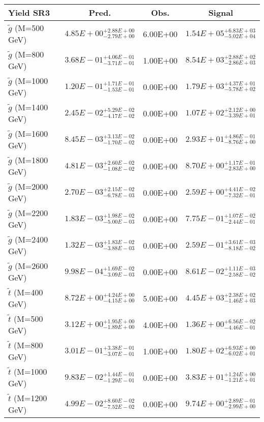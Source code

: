 \documentclass{article}
\begin{document}
 \begin{center}
 \begin{tabular}{ |l|c|c|c| } 
 \hline
 Yield SR3 & Pred. & Obs. & Signal \\
 \hline
 \hline
 $\tilde{g}$ (M=500 GeV) & $4.85E+00^{+2.88E+00}_{-2.79E+00}$ & 6.00E+00 & $1.54E+05^{+6.83E+03}_{-5.02E+04}$ \\
 \hline
 $\tilde{g}$ (M=800 GeV) & $3.68E-01^{+4.06E-01}_{-3.71E-01}$ & 1.00E+00 & $8.54E+03^{+2.88E+02}_{-2.86E+03}$ \\
 \hline
 $\tilde{g}$ (M=1000 GeV) & $1.20E-01^{+1.71E-01}_{-1.53E-01}$ & 0.00E+00 & $1.79E+03^{+4.37E+01}_{-5.78E+02}$ \\
 \hline
 $\tilde{g}$ (M=1400 GeV) & $2.45E-02^{+5.29E-02}_{-4.17E-02}$ & 0.00E+00 & $1.07E+02^{+2.12E+00}_{-3.39E+01}$ \\
 \hline
 $\tilde{g}$ (M=1600 GeV) & $8.45E-03^{+3.13E-02}_{-1.70E-02}$ & 0.00E+00 & $2.93E+01^{+4.86E-01}_{-8.76E+00}$ \\
 \hline
 $\tilde{g}$ (M=1800 GeV) & $4.81E-03^{+2.60E-02}_{-1.08E-02}$ & 0.00E+00 & $8.70E+00^{+1.17E-01}_{-2.83E+00}$ \\
 \hline
 $\tilde{g}$ (M=2000 GeV) & $2.70E-03^{+2.15E-02}_{-6.78E-03}$ & 0.00E+00 & $2.59E+00^{+4.41E-02}_{-7.32E-01}$ \\
 \hline
 $\tilde{g}$ (M=2200 GeV) & $1.83E-03^{+1.98E-02}_{-5.00E-03}$ & 0.00E+00 & $7.75E-01^{+1.07E-02}_{-2.44E-01}$ \\
 \hline
 $\tilde{g}$ (M=2400 GeV) & $1.32E-03^{+1.83E-02}_{-3.88E-03}$ & 0.00E+00 & $2.59E-01^{+3.61E-03}_{-8.18E-02}$ \\
 \hline
 $\tilde{g}$ (M=2600 GeV) & $9.98E-04^{+1.69E-02}_{-3.09E-03}$ & 0.00E+00 & $8.61E-02^{+1.11E-03}_{-2.58E-02}$ \\
 \hline
 $\tilde{t}$ (M=400 GeV) & $8.72E+00^{+4.24E+00}_{-4.15E+00}$ & 5.00E+00 & $4.45E+03^{+2.38E+02}_{-1.46E+03}$ \\
 \hline
 $\tilde{t}$ (M=500 GeV) & $3.12E+00^{+1.95E+00}_{-1.89E+00}$ & 4.00E+00 & $1.36E+00^{+6.56E-02}_{-4.46E-01}$ \\
 \hline
 $\tilde{t}$ (M=800 GeV) & $3.01E-01^{+3.38E-01}_{-3.07E-01}$ & 1.00E+00 & $1.80E+02^{+6.93E+00}_{-6.02E+01}$ \\
 \hline
 $\tilde{t}$ (M=1000 GeV) & $9.83E-02^{+1.44E-01}_{-1.29E-01}$ & 0.00E+00 & $3.83E+01^{+1.24E+00}_{-1.21E+01}$ \\
 \hline
 $\tilde{t}$ (M=1200 GeV) & $4.99E-02^{+8.60E-02}_{-7.52E-02}$ & 0.00E+00 & $9.74E+00^{+2.89E-01}_{-2.99E+00}$ \\

\end{tabular}
\end{center}
\end{document}
